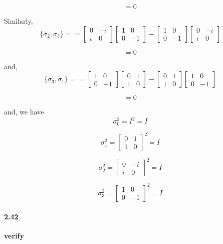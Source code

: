 $$ = 0$$

Similarly,
$$ \{\sigma_2, \sigma_3\}  = 
= \begin{bmatrix}
    0 & -\iota \\ \iota & 0
\end{bmatrix} \begin{bmatrix}
    1 & 0 \\ 0 & -1
\end{bmatrix} - \begin{bmatrix}
    1 & 0 \\ 0 & -1
\end{bmatrix} \begin{bmatrix}
    0 & -\iota \\ \iota & 0
\end{bmatrix}$$


$$ = 0 $$

and,
$$ \{\sigma_3, \sigma_1\}  = = \begin{bmatrix}
     1 & 0 \\ 0 & -1
 \end{bmatrix} \begin{bmatrix}
     0 & 1 \\ 1 & 0
 \end{bmatrix}
 - \begin{bmatrix}
     0 & 1 \\ 1 & 0
 \end{bmatrix} \begin{bmatrix}
     1 & 0 \\ 0 & -1
 \end{bmatrix}$$

 $$ = 0$$

and, we have
$$ \sigma_0^2 = I^2 = I$$

$$ \sigma_1^2 = \begin{bmatrix}
    0 & 1 \\ 1 & 0
\end{bmatrix}^2 = I$$

$$ \sigma_2^2 = \begin{bmatrix}
    0 & -i \\ i & 0
\end{bmatrix}^2 = I$$

$$ \sigma_3^2 = \begin{bmatrix}
    1 & 0 \\ 0 & -1
\end{bmatrix}^2 = I$$



 \paragraph{2.42} \textbf{verify} \\%

